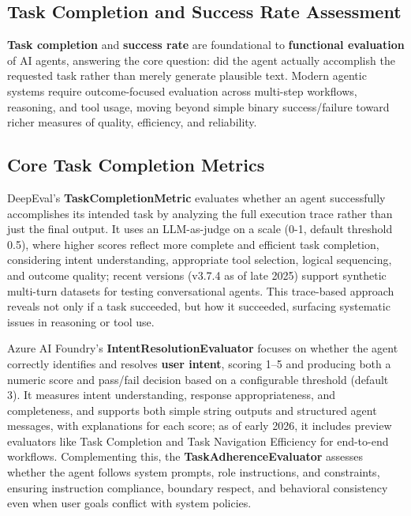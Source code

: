
\begin{TNtwocol}
\section{Task Completion and Success Rate Assessment}

\textbf{Task completion} and \textbf{success rate} are foundational to \textbf{functional evaluation} of AI agents, answering the core question: did the agent actually accomplish the requested task rather than merely generate plausible text. Modern agentic systems require outcome-focused evaluation across multi-step workflows, reasoning, and tool usage, moving beyond simple binary success/failure toward richer measures of quality, efficiency, and reliability.

\subsection*{Core Task Completion Metrics}

DeepEval’s \textbf{TaskCompletionMetric} evaluates whether an agent successfully accomplishes its intended task by analyzing the full execution trace rather than just the final output. It uses an LLM-as-judge on a scale (0-1, default threshold 0.5), where higher scores reflect more complete and efficient task completion, considering intent understanding, appropriate tool selection, logical sequencing, and outcome quality; recent versions (v3.7.4 as of late 2025) support synthetic multi-turn datasets for testing conversational agents. This trace-based approach reveals not only if a task succeeded, but how it succeeded, surfacing systematic issues in reasoning or tool use.

Azure AI Foundry’s \textbf{IntentResolutionEvaluator} focuses on whether the agent correctly identifies and resolves \textbf{user intent}, scoring 1–5 and producing both a numeric score and pass/fail decision based on a configurable threshold (default 3). It measures intent understanding, response appropriateness, and completeness, and supports both simple string outputs and structured agent messages, with explanations for each score; as of early 2026, it includes preview evaluators like Task Completion and Task Navigation Efficiency for end-to-end workflows. Complementing this, the \textbf{TaskAdherenceEvaluator} assesses whether the agent follows system prompts, role instructions, and constraints, ensuring instruction compliance, boundary respect, and behavioral consistency even when user goals conflict with system policies.
​


\end{TNtwocol}
